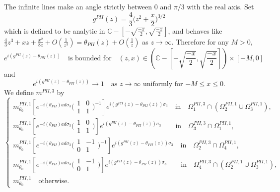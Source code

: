 \documentclass{amsart}
\theoremstyle{definition}
\theoremstyle{remark}
\numberwithin{equation}{section}
\newcommand{\C}{\mathbb C}
\begin{document}
The infinite lines make an angle strictly between $0$ and $\pi/3$ 
with the real axis.
Set 
\begin{equation}\label{e-z5}
   g^{PII}(z)=\frac43 \bigl(z^2+\frac{x}2 \bigr)^{3/2}
\end{equation}
which is defined to be analytic in $\C-[-\sqrt{\frac{-x}2}, 
\sqrt{\frac{-x}2}]$, and behaves like 
$\frac43 z^3+xz+\frac{x^2}{8z}+O(\frac1{z^3}) = \theta_{PII}(z)+O(\frac1{z})$ 
as $z\to\infty$.
Therefore for any $M>0$, 
\begin{equation}\label{e-z6}
    e^{i(g^{PII}(z)-\theta_{PII}(z))} \quad \text{is bounded for}
\quad (z,x)\in (\C-[-\sqrt{\frac{-x}2},\sqrt{\frac{-x}2}]) \times [-M,0]
\end{equation}
and
\begin{equation}\label{e-z7}
    e^{i(g^{PII}(z)-\theta_{PII}(z))} \to 1 \quad \text{as $z\to\infty$ 
uniformly for $-M\le x\le 0.$}
\end{equation}
We define $m^{PII,3}$ by 
\begin{equation*}
  \begin{cases}
    m_{\theta_0}^{PII,1}[e^{-i(\theta_{PII})ad\sigma_3}
\bigl(\begin{smallmatrix} 1&0\\1&1 \end{smallmatrix} \bigr)^{-1}]
e^{i(g^{PII}(z)-\theta_{PII}(z))\sigma_3}
\quad\text{in}\quad 
\Omega^{PII,3}_1\cap(\Omega^{PII,1}_2\cup\Omega^{PII,1}_3),\\
    m_{\theta_0}^{PII,1}[e^{-i(\theta_{PII})ad\sigma_3}
\bigl(\begin{smallmatrix} 1&0\\1&1 \end{smallmatrix} \bigr)]
e^{i(g^{PII}(z)-\theta_{PII}(z))\sigma_3}
\qquad\text{in}\quad{\Omega^{PII,3}_3\cap\Omega^{PII,1}_1},\\
    m_{\theta_0}^{PII,1}[e^{-i(\theta_{PII})ad\sigma_3}
\bigl(\begin{smallmatrix} 1&-1\\0&1 \end{smallmatrix} \bigr)^{-1}]
e^{i(g^{PII}(z)-\theta_{PII}(z))\sigma_3}
\quad\text{in}\quad{\Omega^{PII,3}_2\cap\Omega^{PII,1}_4},\\
    m_{\theta_0}^{PII,1}[e^{-i(\theta_{PII})ad\sigma_3}
\bigl(\begin{smallmatrix} 1&-1\\0&1 \end{smallmatrix} \bigr)]
e^{i(g^{PII}(z)-\theta_{PII}(z))\sigma_3}
\qquad\text{in}\quad
\Omega^{PII,3}_4\cap(\Omega^{PII,1}_2\cup\Omega^{PII,1}_3),\\
    m_{\theta_0}^{PII,1}\quad\text{otherwise}.
  \end{cases}
\end{equation*}
\end{document}
